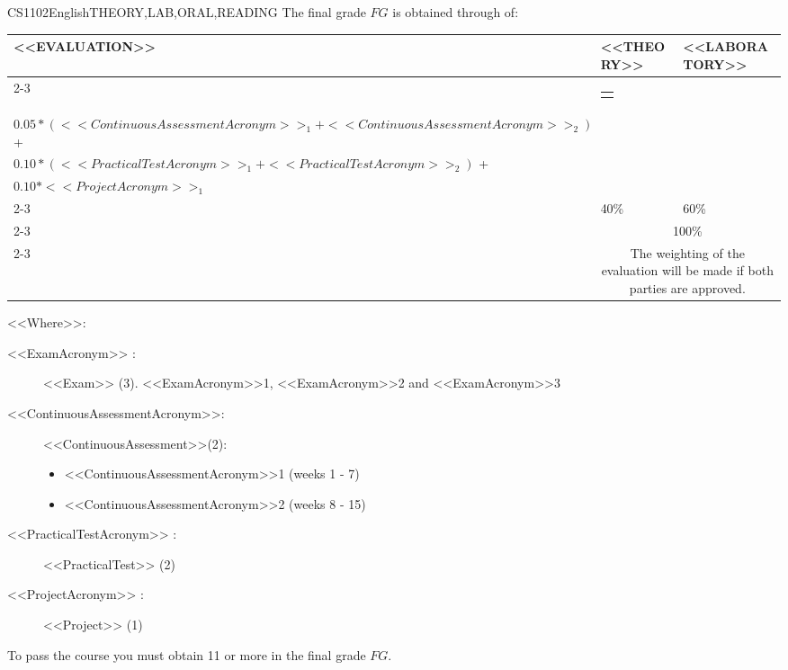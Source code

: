   \begin{evaluation}{CS1102}{English}{THEORY,LAB,ORAL,READING}
  The final grade $FG$ is obtained through of:
 
  \begin{tabularx}{0.9\textwidth}{|X|p{}|p{}|} \hline
  \multirow{4}{*}{\uppercase{<<Evaluation>>}} & \uppercase{<<Theory>>} & \uppercase{<<Laboratory>>} \\ \cline{2-3}
  & %
      \begin{minipage}{0.95\textwidth}
      \begin{tabular}{l}
          $0.40*<<ExamAcronym>>_{1}$
          \end{tabular} 
      \end{minipage} 
  & %
      \begin{minipage}{0.95\textwidth}
      \begin{tabular}{l}
        $0.10*(<<ExamAcronym>>_{2} + <<ExamAcronym>>_{3})$ + \\
        $0.05*(<<ContinuousAssessmentAcronym>>_{1} + <<ContinuousAssessmentAcronym>>_{2})$ + \\
        $0.10*(<<PracticalTestAcronym>>_{1} + <<PracticalTestAcronym>>_{2})$ + \\
        $0.10*<<ProjectAcronym>>_{1}$
      \end{tabular} 
      \end{minipage}                 \\ \cline{2-3}
  
  & %
  40\% 
  & %
  60\% \\ \cline{2-3}
  & \multicolumn{2}{|c|}{100\%}  \\ \cline{2-3}
  & \multicolumn{2}{|c|}{The weighting of the evaluation will be made if both parties are approved.}  \\ \hline
  \end{tabularx}
    
  \vspace{2mm}
  \noindent <<Where>>:
  \begin{description}
      \item[<<ExamAcronym>> :] <<Exam>> (3). <<ExamAcronym>>1, <<ExamAcronym>>2 and <<ExamAcronym>>3 
      \item[<<ContinuousAssessmentAcronym>>:]<<ContinuousAssessment>>(2):
      \begin{itemize}
              \item <<ContinuousAssessmentAcronym>>1 (weeks 1 - 7) 
              \item <<ContinuousAssessmentAcronym>>2 (weeks 8 - 15)
      \end{itemize}
      \item[<<PracticalTestAcronym>> :] <<PracticalTest>>  (2)
      \item[<<ProjectAcronym>> :] <<Project>> (1)
  \end{description}
  
  \noindent To pass the course you must obtain 11 or more in the final grade $FG$.
  \end{evaluation}
 
